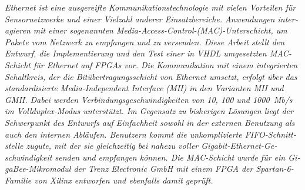 \documentclass[a4paper, 11pt, oneside]{Thesis}  %
\begin{document}
{%
\begin{otherlanguage}{ngerman}
\emph{Ethernet ist eine ausgereifte Kommunikationstechnologie mit vielen Vorteilen für Sensornetzwerke und einer Vielzahl anderer Einsatzbereiche. Anwendungen interagieren mit einer sogenannten Media-Access-Control-(MAC)-Unterschicht, um Pakete vom Netzwerk zu empfangen und zu versenden. Diese Arbeit stellt den Entwurf, die Implementierung und den Test einer in VHDL umgesetzten MAC-Schicht für Ethernet auf FPGAs vor. Die Kommunikation mit einem integrierten Schaltkreis, der die Bitübertragungsschicht von Ethernet umsetzt, erfolgt über das standardisierte Media-Independent Interface (MII) in den Varianten MII und GMII. Dabei werden Verbindungsgeschwindigkeiten von 10, 100 und 1000~Mb/s im Vollduplex-Modus unterstützt. Im Gegensatz zu bisherigen Lösungen liegt der Schwerpunkt des Entwurfs auf Einfachheit sowohl in der externen Benutzung als auch den internen Abläufen. Benutzern kommt die unkomplizierte FIFO-Schnittstelle zugute, mit der sie gleichzeitig bei nahezu voller Gigabit-Ethernet-Geschwindigkeit senden und empfangen können. Die MAC-Schicht wurde für ein GigaBee-Mikromodul der Trenz Electronic GmbH mit einem FPGA der Spartan-6-Familie von Xilinx entworfen und ebenfalls damit geprüft.}
\end{otherlanguage}

}

\clearpage  %



\pagestyle{fancy}  %


\tableofcontents  %

\listoffigures  %

\listoftables  %
\end{document}
